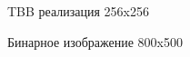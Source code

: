 \documentclass{report}
\begin{document}
\begin{figure}[H]
\caption{TBB реализация 256x256}
\end{figure}

\begin{figure}[H]
\caption{Бинарное изображение 800x500}
\end{figure}
\end{document}
